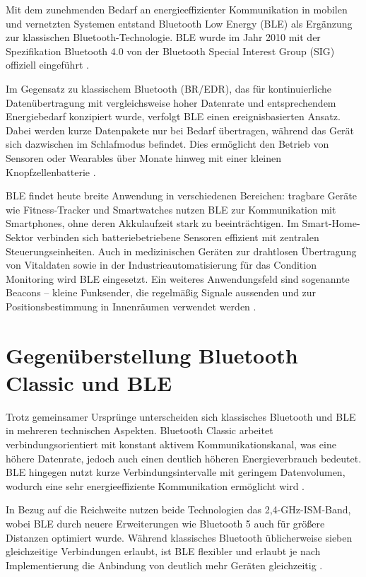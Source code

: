 Mit dem zunehmenden Bedarf an energieeffizienter Kommunikation in mobilen und vernetzten Systemen entstand Bluetooth Low Energy (BLE) als Ergänzung zur klassischen Bluetooth-Technologie. BLE wurde im Jahr 2010 mit der Spezifikation Bluetooth 4.0 von der Bluetooth Special Interest Group (SIG) offiziell eingeführt \cite{BluetoothSIG.2004, BluetoothSpecialInterestGroup.2024}.

Im Gegensatz zu klassischem Bluetooth (BR/EDR), das für kontinuierliche Datenübertragung mit vergleichsweise hoher Datenrate und entsprechendem Energiebedarf konzipiert wurde, verfolgt BLE einen ereignisbasierten Ansatz. Dabei werden kurze Datenpakete nur bei Bedarf übertragen, während das Gerät sich dazwischen im Schlafmodus befindet. Dies ermöglicht den Betrieb von Sensoren oder Wearables über Monate hinweg mit einer kleinen Knopfzellenbatterie \cite{Tosi.2017, Arduino.2025b}.

BLE findet heute breite Anwendung in verschiedenen Bereichen: tragbare Geräte wie Fitness-Tracker und Smartwatches nutzen BLE zur Kommunikation mit Smartphones, ohne deren Akkulaufzeit stark zu beeinträchtigen. Im Smart-Home-Sektor verbinden sich batteriebetriebene Sensoren effizient mit zentralen Steuerungseinheiten. Auch in medizinischen Geräten zur drahtlosen Übertragung von Vitaldaten sowie in der Industrieautomatisierung für das Condition Monitoring wird BLE eingesetzt. Ein weiteres Anwendungsfeld sind sogenannte Beacons – kleine Funksender, die regelmäßig Signale aussenden und zur Positionsbestimmung in Innenräumen verwendet werden \cite{BluetoothSpecialInterestGroup.2025, Kumar.2023}.


\section{Gegenüberstellung Bluetooth Classic und BLE}

Trotz gemeinsamer Ursprünge unterscheiden sich klassisches Bluetooth und BLE in mehreren technischen Aspekten. Bluetooth Classic arbeitet verbindungsorientiert mit konstant aktivem Kommunikationskanal, was eine höhere Datenrate, jedoch auch einen deutlich höheren Energieverbrauch bedeutet. BLE hingegen nutzt kurze Verbindungsintervalle mit geringem Datenvolumen, wodurch eine sehr energieeffiziente Kommunikation ermöglicht wird \cite{Arduino.2025b, Kumar.2023}.

In Bezug auf die Reichweite nutzen beide Technologien das 2{,}4-GHz-ISM-Band, wobei BLE durch neuere Erweiterungen wie Bluetooth 5 auch für größere Distanzen optimiert wurde. Während klassisches Bluetooth üblicherweise sieben gleichzeitige Verbindungen erlaubt, ist BLE flexibler und erlaubt je nach Implementierung die Anbindung von deutlich mehr Geräten gleichzeitig \cite{BluetoothSpecialInterestGroup.2024, Kumar.2023}.


